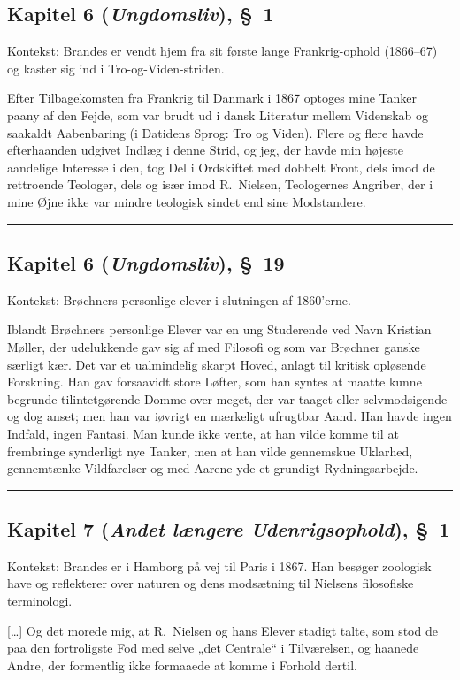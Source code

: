 \documentclass[12pt,a4paper]{article}
\newcommand{\apage}[1]{\marginnote{\footnotesize\textit{[#1]}}}
\begin{document}
\subsection*{Kapitel 6 (\emph{Ungdomsliv}), §~1}

\noindent Kontekst: Brandes er vendt hjem fra sit første lange
Frankrig-ophold (1866--67) og kaster sig ind i Tro-og-Viden-striden.

\medskip

\apage{203}Efter Tilbagekomsten fra Frankrig til Danmark i 1867
optoges mine Tanker paany af den Fejde, som var brudt ud i dansk
Literatur mellem Videnskab og saakaldt Aabenbaring (i Datidens Sprog:
Tro og Viden). Flere og flere havde efterhaanden udgivet Indlæg i denne
Strid, og jeg, der havde min højeste aandelige Interesse i den, tog Del i
Ordskiftet med dobbelt Front, dels imod de rettroende Teologer, dels og
især imod R.\ Nielsen, Teologernes Angriber, der i mine Øjne ikke var
mindre teologisk sindet end sine Modstandere.

\bigskip\hrule\bigskip

\subsection*{Kapitel 6 (\emph{Ungdomsliv}), §~19}

\noindent Kontekst: Brøchners personlige elever i slutningen af 1860'erne.

\medskip

Iblandt Brøchners personlige Elever var en ung Studerende ved Navn
Kristian Møller, der udelukkende gav sig af med Filosofi og som var
Brøchner ganske særligt kær. \apage{239}Det var et ualmindelig skarpt
Hoved, anlagt til kritisk opløsende Forskning. Han gav forsaavidt store
Løfter, som han syntes at maatte kunne begrunde tilintetgørende Domme
over meget, der var taaget eller selvmodsigende og dog anset; men han
var iøvrigt en mærkeligt ufrugtbar Aand. Han havde ingen Indfald, ingen
Fantasi. Man kunde ikke vente, at han vilde komme til at frembringe
synderligt nye Tanker, men at han vilde gennemskue Uklarhed, gennemtænke
Vildfarelser og med Aarene yde et grundigt Rydningsarbejde.

\bigskip\hrule\bigskip

\subsection*{Kapitel 7 (\emph{Andet længere Udenrigsophold}), §~1}

\noindent Kontekst: Brandes er i Hamborg på vej til Paris i 1867.
Han besøger zoologisk have og reflekterer over naturen og dens
modsætning til Nielsens filosofiske terminologi.

\medskip

[\ldots] Og det morede mig, at R.\ Nielsen og hans Elever
stadigt talte, som stod de paa den fortroligste Fod med selve „det
Centrale“ i Tilværelsen, og haanede Andre, der formentlig ikke formaaede
at komme i Forhold dertil.
\end{document}

